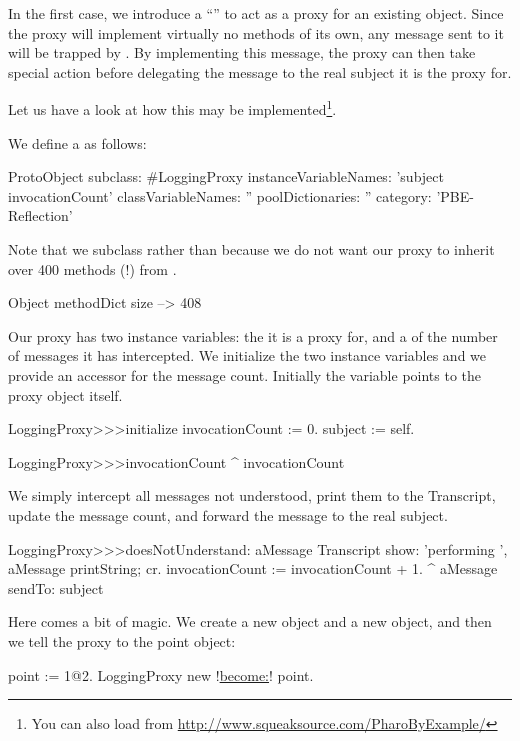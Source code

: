 \documentclass[a4paper,10pt,twoside]{book}
\begin{document}
In the first case, we introduce a ``'' to act as a proxy for an existing object.
Since the proxy will implement virtually no methods of its own, any message sent to it will be trapped by . By implementing this message, the proxy can then take special action before delegating the message to the real subject it is the proxy for.

Let us have a look at how this may be implemented\footnote{You can also load  from \url{http://www.squeaksource.com/PharoByExample/}}.

We define a  as follows:
\begin{code}{}
ProtoObject subclass: #LoggingProxy
	instanceVariableNames: 'subject invocationCount'
	classVariableNames: ''
	poolDictionaries: ''
	category: 'PBE-Reflection'
\end{code}
Note that we subclass  rather than  because we do not want our proxy to inherit over 400 methods (!) from .

\begin{code}{}
Object methodDict size --> 408
\end{code}

Our proxy has two instance variables: the  it is a proxy for, and a  of the number of messages it has intercepted.
We initialize the two instance variables and we provide an accessor for the message count.
Initially the  variable points to the proxy object itself.
\begin{code}{}
LoggingProxy>>>initialize
	invocationCount := 0.
	subject := self.
\end{code}

\begin{code}{}
LoggingProxy>>>invocationCount
	^ invocationCount
\end{code}

We simply intercept all messages not understood, print them to the Transcript, update the message count, and forward the message to the real subject.
\begin{code}{}
LoggingProxy>>>doesNotUnderstand: aMessage 
	Transcript show: 'performing ', aMessage printString; cr.
	invocationCount := invocationCount + 1.
	^ aMessage sendTo: subject
\end{code}

Here comes a bit of magic.
We create a new  object and a new  object, and then we tell the proxy to  the point object:
\begin{code}{}
point := 1@2.
LoggingProxy new !\underline{become:}! point.
\end{code}
\end{document}
